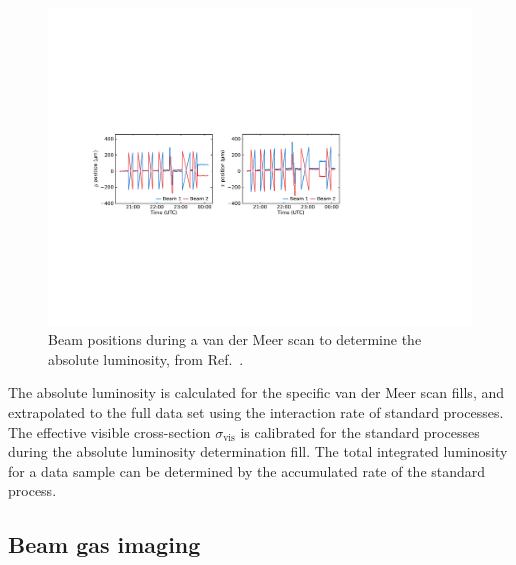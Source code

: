 \begin{figure}[!h]
    \centering
    \includegraphics[width=1.0\textwidth]{figs/Detector/lumi_plots.pdf}
    \caption{Beam positions during a van der Meer scan to determine the absolute luminosity, from Ref.~\cite{1748-0221-9-12-P12005}.}
    \label{fig:Dec_vdm_scan}   
\end{figure}
The absolute luminosity is calculated for the specific van der Meer scan fills, and extrapolated to the full data set using the interaction rate of standard processes. The effective visible cross-section $\sigma_{\text{vis}}$ is calibrated for the standard processes during the absolute luminosity determination fill. The total integrated luminosity for a data sample can be determined by the accumulated rate of the standard process.  


\subsection{Beam gas imaging}

